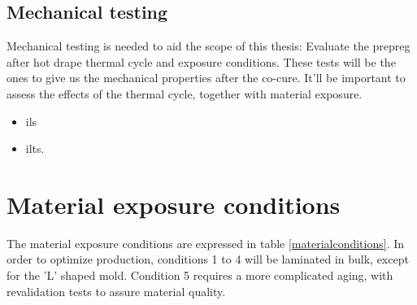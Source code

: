 \subsection{Mechanical testing}
\label{sub:mechanical}

Mechanical testing is needed to aid the scope of this thesis: Evaluate the prepreg after hot drape thermal cycle and exposure conditions. These tests will be the ones to give us the mechanical properties after the co-cure. It'll be important to assess the effects of the thermal cycle, together with material exposure. 

\begin{itemize}
	\item \texorpdfstring{\gls{ils}};
	\item \gls{ilts}.
\end{itemize}


\section{Material exposure conditions}
\label{expcond}

The material exposure conditions are expressed in table \ref{materialconditions}. In order to optimize production, conditions 1 to 4 will be laminated in bulk, except for the 'L' shaped mold. Condition 5 requires a more complicated aging, with revalidation tests to assure material quality. 

